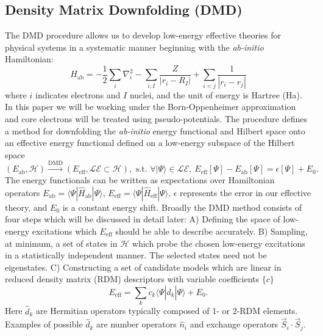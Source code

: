 \documentclass{article}
\begin{document}
\subsection{Density Matrix Downfolding (DMD)}
The DMD procedure allows us to develop low-energy effective theories for physical systems in a systematic manner beginning with the \textit{ab-initio} Hamiltonian:
\begin{equation}
\hat{H}_\text{ab} = -\frac{1}{2} \sum_{i} \nabla_i^2 - \sum_{i,I}\frac{Z}{|r_i - R_I|} + \sum_{i<j}\frac{1}{|r_i - r_j|}
\label{eq:Hab}
\end{equation}
where $i$ indicates electrons and $I$ nuclei, and the unit of energy is Hartree (Ha).
In this paper we will be working under the Born-Oppenheimer approximation and core electrons will be treated using pseudo-potentials.
The procedure defines a method for downfolding the \textit{ab-initio} energy functional and Hilbert space onto an effective energy functional defined on a low-energy subspace of the Hilbert space 
\begin{equation}
(E_\text{ab}, \mathcal{H}) \xrightarrow{\text{DMD}} (E_\text{eff}, \mathcal{LE} \subset \mathcal{H}), \text{ s.t. }
\forall |\Psi\rangle \in \mathcal{LE}, \ E_\text{eff}[\Psi] - E_\text{ab}[\Psi] = \epsilon[\Psi] + E_0.
\label{eq:DMD}
\end{equation} 
The energy functionals can be written as expectations over Hamiltonian operators $E_\text{ab} = \langle \Psi | \hat{H}_\text{ab} |\Psi \rangle$, $E_\text{eff} = \langle \Psi | \hat{H}_\text{eff} |\Psi \rangle$, $\epsilon$ represents the error in our effective theory, and $E_0$ is a constant energy shift.
Broadly the DMD method consists of four steps which will be discussed in detail later: 
A) Defining the space of low-energy excitations which $E_\text{eff}$ should be able to describe accurately.
B) Sampling, at minimum, a set of states in $\mathcal{H}$ which probe the chosen low-energy excitations in a statistically independent manner. The selected states need not be eigenstates. 
C) Constructing a set of candidate models which are linear in reduced density matrix (RDM) descriptors with variable coefficients $\{c\}$
\begin{equation}
E_\text{eff} = \sum_k c_k \langle \Psi | \hat{d}_k |\Psi \rangle + E_0.
\label{eq:Eeff}
\end{equation}
Here $\hat{d}_k$ are Hermitian operators typically composed of 1- or 2-RDM elements. 
Examples of possible $\hat{d}_k$ are number operators $\hat{n}_i$ and exchange operators $\vec{S}_i \cdot \vec{S}_j$.
\end{document}
